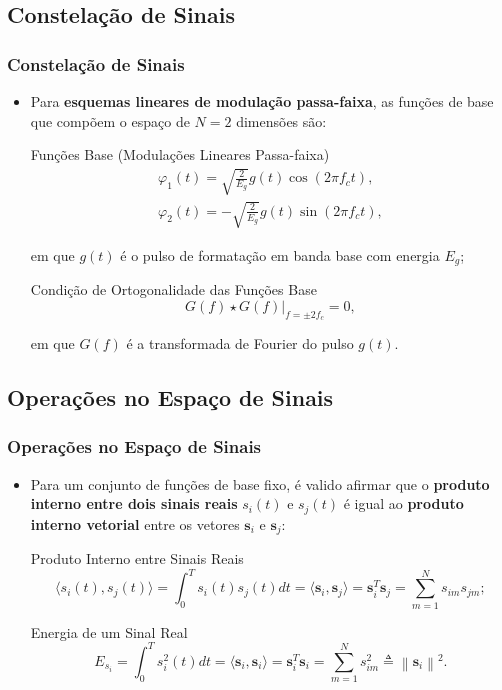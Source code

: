 \documentclass{beamer}
\newcommand{\pag}[1] {\begin{frame}#1\end{frame}}
\newcommand{\norm}[1]{\left\lVert#1\right\rVert}
\begin{document}
\subsection{Constelação de Sinais}
\pag{
	\frametitle{Constelação de Sinais}
	\begin{itemize}
		\item Para \textbf{esquemas lineares de modulação passa-faixa}, as funções de base que compõem o espaço de $N = 2$ dimensões são:
		\begin{block}{Funções Base (Modulações Lineares Passa-faixa)}
			\begin{subequations}
				\begin{align}
				        \varphi_{1}(t) = \sqrt{\frac{2}{E_{g}}}g(t)\cos(2\pi f_{c} t),   \\
				        \varphi_{2}(t) = -\sqrt{\frac{2}{E_{g}}}g(t)\sin(2\pi f_{c} t), \label{eq:MaxE}
				\end{align}
			\end{subequations}
		\end{block}
em que $g(t)$ é o pulso de formatação em banda base com energia $E_{g}$;
		\begin{block}{Condição de Ortogonalidade das Funções Base}
			\begin{equation}
				G(f)\star G(f)\vert_{f = \pm 2f_{c}} = 0,
			\end{equation}
		\end{block}
em que $G(f)$ é a transformada de Fourier do pulso $g(t)$.
	\end{itemize}
}

\subsection{Operações no Espaço de Sinais}
\pag{
	\frametitle{Operações no Espaço de Sinais}
	\begin{itemize}
		\item Para um conjunto de funções de base fixo, é valido afirmar que o \textbf{produto interno entre dois sinais reais} $s_{i}(t)$ e $s_{j}(t)$ é igual ao \textbf{produto interno vetorial} entre os vetores $\mathbf{s}_{i}$ e $\mathbf{s}_{j}$:
		\begin{block}{Produto Interno entre Sinais Reais}
			\begin{equation}
				\langle s_{i}(t), s_{j}(t)\rangle = \int_{0}^{T} s_{i}(t) s_{j}(t) dt = \langle \mathbf{s}_{i}, \mathbf{s}_{j}\rangle = \mathbf{s}_{i}^{T} \mathbf{s}_{j} = \sum_{m = 1}^{N} s_{im}s_{jm};
			\end{equation}
		\end{block}
		\begin{block}{Energia de um Sinal Real}
			\begin{equation}
				E_{s_{i}} = \int_{0}^{T}s_{i}^{2}(t)dt = \langle \mathbf{s}_{i}, \mathbf{s}_{i}\rangle =  \mathbf{s}_{i}^{T} \mathbf{s}_{i} = \sum_{m = 1}^{N} s_{im}^2 \triangleq \norm{\mathbf{s}_{i}}^2.
			\end{equation}
		\end{block}
	\end{itemize}
}
\end{document}
